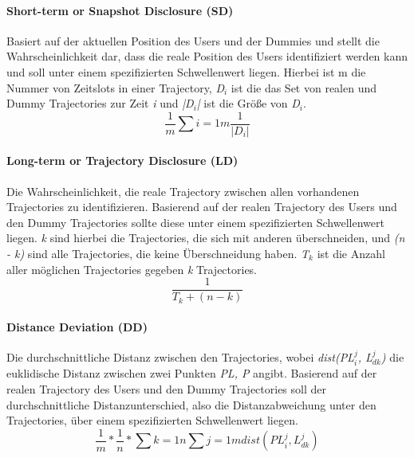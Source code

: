 	\paragraph{Short-term or Snapshot Disclosure (SD)} Basiert auf der aktuellen Position des Users und der Dummies und stellt die Wahrscheinlichkeit dar, dass die reale Position des Users identifiziert werden kann und soll unter einem spezifizierten Schwellenwert liegen. Hierbei ist m die Nummer von Zeitslots in einer Trajectory, \textit{D$_{i}$} ist die das Set von realen und Dummy Trajectories zur Zeit \textit{i} und \textit{|D$_{i}$|} ist die Größe von \textit{D$_{i}$}.
	\begin{equation}
	\label{equation:SD}
	\frac{1}{m} \sum{i=1}{m}{\frac{1}{\left\lvert D_{i} \right\rvert}}
	\end{equation}	
	
	\paragraph{Long-term or Trajectory Disclosure (LD)} Die Wahrscheinlichkeit, die reale Trajectory zwischen allen vorhandenen Trajectories zu identifizieren. Basierend auf der realen Trajectory des Users und den Dummy Trajectories sollte diese unter einem spezifizierten Schwellenwert liegen. \textit{k} sind hierbei die Trajectories, die sich mit anderen überschneiden, und \textit{(n - k)} sind alle Trajectories, die keine Überschneidung haben. \textit{T$_{k}$} ist die Anzahl aller möglichen Trajectories gegeben \textit{k} Trajectories.
	\begin{equation}
	\label{equation:LD}
	\frac{1}{T_{k} + \left( n - k \right)}
	\end{equation}	
	
	\paragraph{Distance Deviation (DD)} Die durchschnittliche Distanz zwischen den Trajectories, wobei \textit{dist(PL$_{i}^{j}$, L$_{dk}^{j}$)} die euklidische Distanz zwischen zwei Punkten \textit{PL, P} angibt. Basierend auf der realen Trajectory des Users und den Dummy Trajectories soll der durchschnittliche Distanzunterschied, also die Distanzabweichung unter den Trajectories, über einem spezifizierten Schwellenwert liegen.
	\begin{equation}
	\label{equation:DD}
	\frac{1}{m} * \frac{1}{n} * \sum{k=1}{n}{\sum{j=1}{m}{dist\left(PL_{i}^{j}, L_{dk}^{j}\right)}}
	\end{equation}	

